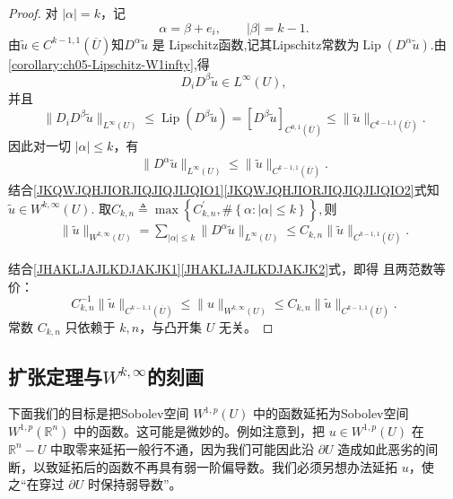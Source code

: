\documentclass[../../main.tex]{subfiles}
\begin{document}
\begin{proof}
对 \(|\alpha|=k\)，记
\[
\alpha=\beta+e_i,
\qquad
|\beta|=k-1.
\]
由$\widetilde u\in C^{k-1,1}(\overline U)$知\(D^\alpha\widetilde u\) 是 Lipschitz函数,记其Lipschitz常数为$\operatorname{Lip}(D^\alpha\widetilde u)$.由\cref{corollary:ch05-Lipschitz-W1infty},得
\[
D_iD^\beta\widetilde u\in L^\infty(U),
\]
并且
\[
\|D_iD^\beta\widetilde u\|_{L^\infty(U)}
\leqslant
\operatorname{Lip}(D^\beta\widetilde u)
=
[D^\beta\widetilde u]_{C^{0,1}(\overline U)}
\leqslant
\|\widetilde u\|_{C^{k-1,1}(\overline U)}.
\]
因此对一切 \(|\alpha|\leqslant k\)，有
\begin{align}
\|D^\alpha\widetilde u\|_{L^\infty(U)}
\leqslant
\|\widetilde u\|_{C^{k-1,1}(\overline U)}.\label{JKQWJQHJIORJIQJIQJIJQIO2}
\end{align}
结合\eqref{JKQWJQHJIORJIQJIQJIJQIO1}\eqref{JKQWJQHJIORJIQJIQJIJQIO2}式知$\widetilde u\in W^{k,\infty}(U).$
取$C_{k,n}\triangleq \max \left\{ C_{k,n}^{\prime},\#\left\{ \alpha :\left| \alpha \right|\leqslant k \right\} \right\},$则
\begin{align}
\|\widetilde u\|_{W^{k,\infty}(U)}
=
\sum_{|\alpha|\leqslant k}
\|D^\alpha \widetilde u\|_{L^\infty(U)}
\leqslant C_{k,n}
\|\widetilde u\|_{C^{k-1,1}(\overline U)}.\label{JHAKLJAJLKDJAKJK2}
\end{align}

结合\eqref{JHAKLJAJLKDJAKJK1}\eqref{JHAKLJAJLKDJAKJK2}式，即得
且两范数等价：
\[
C_{k,n}^{-1}\|\widetilde u\|_{C^{k-1,1}(\overline U)}
\leqslant
\|u\|_{W^{k,\infty}(U)}
\leqslant
C_{k,n}\|\widetilde u\|_{C^{k-1,1}(\overline U)}.
\]
常数 \(C_{k,n}\) 只依赖于 \(k,n\)，与凸开集 \(U\) 无关。
\end{proof}


\subsection{扩张定理与$W^{k,\infty}$的刻画}

下面我们的目标是把Sobolev空间 $W^{1,p}(U)$ 中的函数延拓为Sobolev空间 $W^{1,p}(\mathbb{R}^{n})$ 中的函数。这可能是微妙的。例如注意到，把 $u\in W^{1,p}(U)$ 在 $\mathbb{R}^{n}-U$ 中取零来延拓一般行不通，因为我们可能因此沿 $\partial U$ 造成如此恶劣的间断，以致延拓后的函数不再具有弱一阶偏导数。我们必须另想办法延拓 $u$，使之“在穿过 $\partial U$ 时保持弱导数”。
\end{document}
